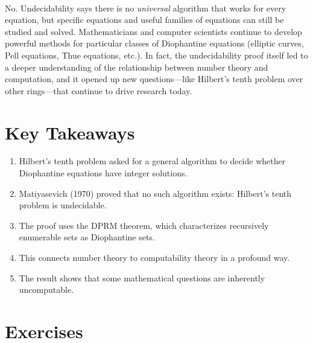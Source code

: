 \begin{description}[font=\bfseries, leftmargin=2em, style=nextline]
\item[Q: Does undecidability mean we should stop trying to solve Diophantine equations?]\hfill\\
No. Undecidability says there is no \emph{universal} algorithm that works for every equation, but specific equations and useful families of equations can still be studied and solved. Mathematicians and computer scientists continue to develop powerful methods for particular classes of Diophantine equations (elliptic curves, Pell equations, Thue equations, etc.). In fact, the undecidability proof itself led to a deeper understanding of the relationship between number theory and computation, and it opened up new questions---like Hilbert's tenth problem over other rings---that continue to drive research today.

\end{description}

\section*{Key Takeaways}

\begin{enumerate}
    \item Hilbert's tenth problem asked for a general algorithm to decide whether Diophantine equations have integer solutions.
    \item Matiyasevich (1970) proved that no such algorithm exists: Hilbert's tenth problem is undecidable.
    \item The proof uses the DPRM theorem, which characterizes recursively enumerable sets as Diophantine sets.
    \item This connects number theory to computability theory in a profound way.
    \item The result shows that some mathematical questions are inherently uncomputable.
\end{enumerate}

\section*{Exercises}


